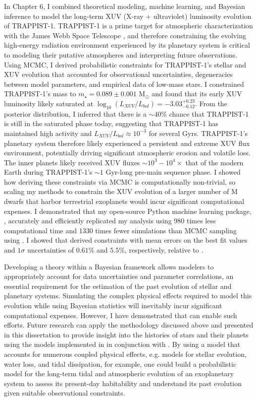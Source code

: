 In Chapter 6, I combined theoretical modeling, machine learning, and Bayesian inference to model the long-term XUV (X-ray + ultraviolet) luminosity evolution of TRAPPIST-1. TRAPPIST-1 is a prime target for atmospheric characterization with the James Webb Space Telescope \citep{Morley2017,Lincowski2018,Lustig2019}, and therefore constraining the evolving high-energy radiation environment experienced by its planetary system is critical to modeling their putative atmospheres and interpreting future observations. Using MCMC, I derived probabilistic constraints for TRAPPIST-1's stellar and XUV evolution that accounted for observational uncertainties, degeneracies between model parameters, and empirical data of low-mass stars. I constrained TRAPPIST-1's mass to $m_{\star} = 0.089 \pm{0.001}$ M$_{\odot}$ and found that its early XUV luminosity likely saturated at $\log_{10}(L_{XUV}/L_{bol}) = -3.03^{+0.23}_{-0.12}$. From the posterior distribution, I inferred that there is a ${\sim}40\%$ chance that TRAPPIST-1 is still in the saturated phase today, suggesting that TRAPPIST-1 has maintained high activity and $L_{XUV}/L_{bol} \approx 10^{-3}$ for several Gyrs. TRAPPIST-1's planetary system therefore likely experienced a persistent and extreme XUV flux environment, potentially driving significant atmospheric erosion and volatile loss. The inner planets likely received XUV fluxes ${\sim}10^3 - 10^4\times$ that of the modern Earth during TRAPPIST-1's ${\sim}1$ Gyr-long pre-main sequence phase. I showed how deriving these constraints via MCMC is computationally non-trivial, so scaling my methods to constrain the XUV evolution of a larger number of M dwarfs that harbor terrestrial exoplanets would incur significant computational expenses. I demonstrated that my open-source Python machine learning package, \approxposterior, accurately and efficiently replicated my analysis using 980 times less computational time and 1330 times fewer simulations than MCMC sampling using \emcee. I showed that \approxposterior derived constraints with mean errors on the best fit values and $1\sigma$ uncertainties of $0.61\%$ and $5.5\%$, respectively, relative to \emcee.

Developing a theory within a Bayesian framework allows modelers to appropriately account for data uncertainties and parameter correlations, an essential requirement for the estimation of the past evolution of stellar and planetary systems. Simulating the complex physical effects required to model this evolution while using Bayesian statistics will inevitably incur significant computational expenses. However, I have demonstrated that \approxposterior can enable such efforts. Future research can apply the methodology discussed above and presented in this dissertation to provide insight into the histories of stars and their planets using the models implemented in \vplanet in conjunction with \approxposterior. By using a model that accounts for numerous coupled physical effects, e.g. models for stellar evolution, water loss, and tidal dissipation, for example, one could build a probabilistic model for the long-term tidal and atmospheric evolution of an exoplanetary system to assess its present-day habitability and understand its past evolution given suitable observational constraints. 

